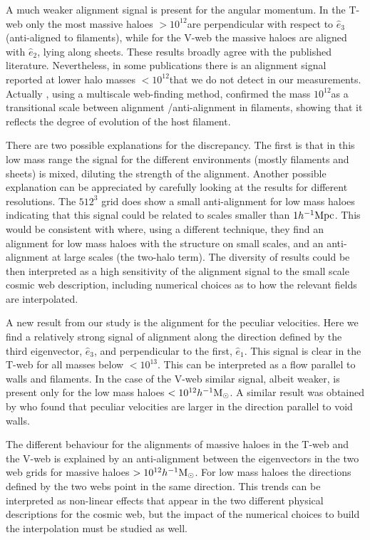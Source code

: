\documentclass[useAMS,usenatbib]{mn2e}
\newcommand{\hMpc}{{\ifmmode{h^{-1}{\rm Mpc}}\else{$h^{-1}$Mpc }\fi}}
\newcommand{\hMsun}{{\ifmmode{h^{-1}{\rm
        {M_{\odot}}}}\else{$h^{-1}{\rm{M_{\odot}}}$~}\fi}}
\begin{document}
A much weaker alignment signal is present for the angular momentum. In
the T-web only the most massive haloes $>10^{12}$\hMsun are
perpendicular with respect to $\hat{e}_3$ (anti-aligned to filaments),
while for the V-web the massive haloes are aligned with $\hat{e}_2$,
lying along sheets. These results broadly agree with the
published literature. Nevertheless, in some publications
\citep{AragonCalvo2007,Hahn2007,AragonCalvo2014} there is an alignment signal
reported at lower halo masses $<10^{12}$\hMsun that we do not detect
in our measurements. Actually \cite{AragonCalvo2014}, using a
multiscale web-finding method, confirmed the mass $10^{12}$\hMsun as a
transitional scale between alignment /anti-alignment in filaments,
showing that it reflects the degree of evolution of the host
filament. 


There are two possible explanations for the discrepancy. The first is
that in this low mass range the signal for the different
environments (mostly filaments and sheets) is mixed, diluting the
strength of the alignment. Another possible explanation can be
appreciated by carefully looking at the results for different
resolutions.  The $512^3$ grid does show a small anti-alignment for
low  mass haloes indicating that this signal could be related to scales
smaller than $1\hMpc$.  This would be consistent with
\cite{Paz2008} where, using a different technique, they find an
alignment for low mass haloes with the structure on small scales, and
an anti-alignment at large scales (the two-halo term). The diversity of
results could be then interpreted as a high sensitivity of the
alignment signal to the small scale cosmic web description, including
numerical choices as to how the relevant fields are interpolated.


A new result from our study is the alignment for the peculiar
velocities. Here we find a relatively strong signal of alignment along
the direction defined by the third eigenvector, $\hat{e}_3$, and
perpendicular to the first, $\hat{e}_1$. This signal is clear in the
T-web for all masses below $<10^{13}$\hMsun. This can be interpreted as
a flow parallel to walls and filaments. In the case of the V-web
similar signal, albeit weaker, is present only for the low mass haloes
$<10^{12}\hMsun$. A similar result was obtained by \citep{Padilla2005}
who found that peculiar velocities are larger in the direction
parallel to void walls. 

The different behaviour for the alignments of massive haloes in the
T-web and the V-web is explained by an anti-alignment between the
eigenvectors in the two web grids for massive haloes
$>10^{12}\hMsun$. For low mass haloes the directions defined by the two
webs point in the same direction. This trends can be interpreted as
non-linear effects that appear in the two different physical
descriptions for the cosmic web, but the impact of the numerical
choices to build the interpolation must be studied as well.
\end{document}
